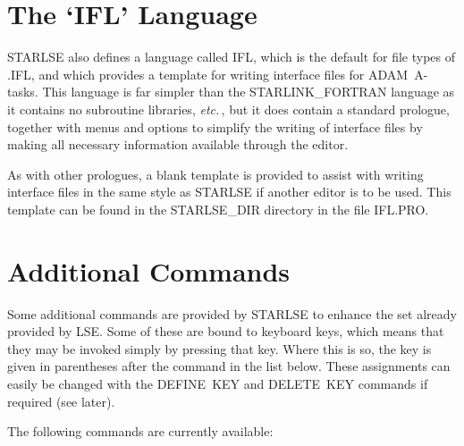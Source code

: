 \section{The `IFL' Language}

STARLSE also defines a language called IFL, which is the default for file
types of \mbox{.IFL}, and which provides a template for writing interface
files for \mbox{ADAM}~\mbox{A-tasks}.
This language is far simpler than the STARLINK\_FORTRAN language as it
contains no subroutine libraries, {\em etc.}\,, but it does contain a standard
prologue, together with menus and options to simplify the writing of
interface files by making all necessary information available through the
editor.

As with other prologues, a blank template is provided to assist with
writing interface files in the same style as \mbox{STARLSE} if another
editor is to be used.
This template can be found in the \mbox{STARLSE\_DIR} directory in the file
\mbox{IFL.PRO}.

\section{Additional Commands}
\label{sect:additionalcommands}

Some additional commands are provided by STARLSE to enhance the set already
provided by \mbox{LSE}.
Some of these are bound to keyboard keys, which means that they may be
invoked simply by pressing that key.
Where this is so, the key is given in parentheses after the command in the
list below.
These assignments can easily be changed with the \mbox{DEFINE}~\mbox{KEY}
and \mbox{DELETE}~\mbox{KEY} commands if required (see later).

The following commands are currently available:

